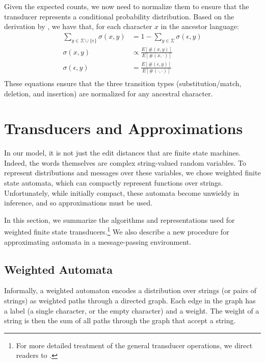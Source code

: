 \documentclass[11pt,a4paper]{article}
\begin{document}
Given the expected counts, we now need to normalize them to ensure
that the transducer represents a conditional probability distribution.
Based on the derivation by , we have that,
for each character $x$ in the ancestor language:
\begin{equation*}
  \begin{split}
    \sum_{y \in \Sigma \cup \{\epsilon\}} \sigma(x,y) &= 1 - \sum_{y \in \Sigma} \sigma(\epsilon,y) \\
    \sigma(x,y) &\propto \frac{E[\#(x,y)]}{E[\#(x,\cdot)]} \\
    \sigma(\epsilon,y) &= \frac{E[\#(\epsilon,y)]}{E[\#(\cdot,\cdot)]} \\
   \end{split}
 \end{equation*}
These equations ensure that the three transition types (substitution/match,
deletion, and insertion) are normalized for any ancestral character.

\section{Transducers and Approximations}

In our model, it is not just the edit distances that are finite
state machines. Indeed, the words themselves are complex string-valued
random variables. To represent distributions and messages over these
variables, we chose weighted finite state automata, which can
compactly represent functions over strings. Unfortunately, while
initially compact, these automata become unwieldy in inference,
and so approximations must be used.

In this section, we summarize the algorithms and representations
used for weighted finite state transducers.\footnote{For more
detailed treatment of the general transducer operations, we direct
readers to .} We also describe a new
procedure for approximating automata in a message-passing environment.

\subsection{Weighted Automata}

Informally, a weighted automaton encodes a distribution over strings
(or pairs of strings) as weighted paths through a directed graph.
Each edge in the graph has a label (a single character, or the empty
character) and a weight. The weight of a string is then the sum
of all paths through the graph that accept a string.
\end{document}
